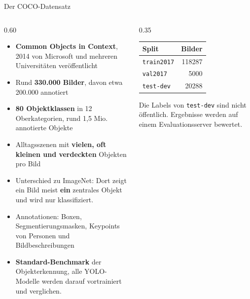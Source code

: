 \begin{frame}{Der COCO-Datensatz}
\footnotesize
\begin{columns}
\begin{column}{0.60\textwidth}
\begin{itemize}
  \item \textbf{Common Objects in Context}, 2014 von Microsoft und mehreren Universitäten veröffentlicht
  \item Rund \textbf{330.000 Bilder}, davon etwa 200.000 annotiert
  \item \textbf{80 Objektklassen} in 12 Oberkategorien, rund 1,5 Mio. annotierte Objekte
  \item Alltagsszenen mit \textbf{vielen, oft kleinen und verdeckten} Objekten pro Bild
  \item Unterschied zu ImageNet: Dort zeigt ein Bild meist \textbf{ein} zentrales Objekt und wird nur klassifiziert.
  \item Annotationen: Boxen, Segmentierungsmasken, Keypoints von Personen und Bildbeschreibungen
  \item \textbf{Standard-Benchmark} der Objekterkennung, alle YOLO-Modelle werden darauf vortrainiert und verglichen.
\end{itemize}
\end{column}
\begin{column}{0.35\textwidth}
\centering
\begin{tabular}{lr}
\toprule
\textbf{Split} & \textbf{Bilder} \\
\midrule
\texttt{train2017} & \num{118287} \\
\texttt{val2017} & \num{5000} \\
\texttt{test-dev} & \num{20288} \\
\bottomrule
\end{tabular}

\vspace{0.8em}
\raggedright
Die Labels von \texttt{test-dev} sind nicht öffentlich. Ergebnisse werden auf einem Evaluationsserver bewertet.
\end{column}
\end{columns}
\end{frame}

